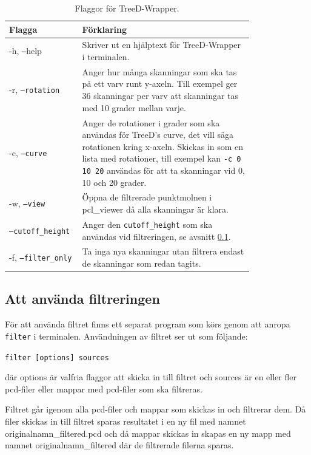 \documentclass[a4paper,titlepage,12pt]{article}
\begin{document}
	\begin{table}[H]
		\centering
		\caption{Flaggor för TreeD-Wrapper.}
		\label{tab:treedwrapper_flaggor}
		
		\begin{tabular}{p{0.2\linewidth}p{0.6\linewidth}}
			Flagga & Förklaring \\
			\hline
			-h, \texttt{--}help & Skriver ut en hjälptext för TreeD-Wrapper i terminalen. \\
			\hline
			-r, \texttt{--rotation} & Anger hur många skanningar som ska tas på ett varv runt y-axeln. Till exempel ger 36 skanningar per varv att skanningar tas med 10 grader mellan varje. \\
			\hline
			-c, \texttt{--curve} & Anger de rotationer i grader som ska användas för TreeD's curve, det vill säga rotationen kring x-axeln. Skickas in som en lista med rotationer, till exempel kan \texttt{-c 0 10 20} användas för att ta skanningar vid 0, 10 och 20 grader. \\
			\hline
			-w, \texttt{--view} & Öppna de filtrerade punktmolnen i pcl\_viewer då alla skanningar är klara. \\
			\hline
			\texttt{--cutoff\_height} & Anger den \texttt{cutoff\_height} som ska användas vid filtreringen, se avsnitt \ref{sec:filtrering}. \\
			\hline
			-f, \texttt{--filter\_only} & Ta inga nya skanningar utan filtrera endast de skanningar som redan tagits. \\
			\hline
		\end{tabular}
		
	\end{table}
	
	\subsection{Att använda filtreringen}
	\label{sec:filtrering}
	För att använda filtret finns ett separat program som körs genom att anropa \texttt{filter} i terminalen. Användningen av filtret ser ut som följande:
	
	\texttt{filter [options] sources}
	
	där options är valfria flaggor att skicka in till filtret och sources är en eller fler pcd-filer eller mappar med pcd-filer som ska filtreras.
	
	Filtret går igenom alla pcd-filer och mappar som skickas in och filtrerar dem. Då filer skickas in till filtret sparas resultatet i en ny fil med namnet originalnamn\_filtered.pcd och då mappar skickas in skapas en ny mapp med namnet originalnamn\_filtered där de filtrerade filerna sparas.
	
\end{document}
